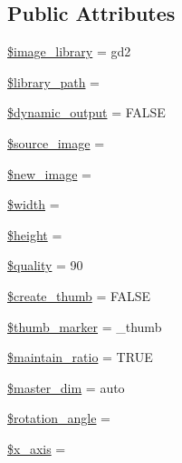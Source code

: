 \subsection*{Public Attributes}
\begin{DoxyCompactItemize}
\item 
\mbox{\hyperlink{class_c_i___image__lib_ac4b224358e1169eec8db344bcb3186c0}{\$image\+\_\+library}} = \textquotesingle{}gd2\textquotesingle{}
\item 
\mbox{\hyperlink{class_c_i___image__lib_ac09f7fc802884aae2149f1df0e53f17a}{\$library\+\_\+path}} = \textquotesingle{}\textquotesingle{}
\item 
\mbox{\hyperlink{class_c_i___image__lib_ad90737913d82776e7d3a7dfaef68e167}{\$dynamic\+\_\+output}} = F\+A\+L\+SE
\item 
\mbox{\hyperlink{class_c_i___image__lib_a54fc395722d5e9f15d656d22ba84e382}{\$source\+\_\+image}} = \textquotesingle{}\textquotesingle{}
\item 
\mbox{\hyperlink{class_c_i___image__lib_a6147ac30032312f2b42a9b05618faf12}{\$new\+\_\+image}} = \textquotesingle{}\textquotesingle{}
\item 
\mbox{\hyperlink{class_c_i___image__lib_a5795120b4b324bc4ca83f1e6fdce7d57}{\$width}} = \textquotesingle{}\textquotesingle{}
\item 
\mbox{\hyperlink{class_c_i___image__lib_a2c265bba1724371bb03e6901297c30b2}{\$height}} = \textquotesingle{}\textquotesingle{}
\item 
\mbox{\hyperlink{class_c_i___image__lib_a0e342ea32cccdc2c932ad23b9796a62a}{\$quality}} = 90
\item 
\mbox{\hyperlink{class_c_i___image__lib_ab1250903cbadaaadb42ec188d38ab398}{\$create\+\_\+thumb}} = F\+A\+L\+SE
\item 
\mbox{\hyperlink{class_c_i___image__lib_a3176700c651c0c3cd8cfa186ba03302a}{\$thumb\+\_\+marker}} = \textquotesingle{}\+\_\+thumb\textquotesingle{}
\item 
\mbox{\hyperlink{class_c_i___image__lib_a7fe1beb3e7d60245c97c60ee4b668d93}{\$maintain\+\_\+ratio}} = T\+R\+UE
\item 
\mbox{\hyperlink{class_c_i___image__lib_ae86c3d7ce316cc0c48a8dcba8ae4130d}{\$master\+\_\+dim}} = \textquotesingle{}auto\textquotesingle{}
\item 
\mbox{\hyperlink{class_c_i___image__lib_a9410d2e216c0c1dd852031f2a39e7ec7}{\$rotation\+\_\+angle}} = \textquotesingle{}\textquotesingle{}
\item 
\mbox{\hyperlink{class_c_i___image__lib_a128914b11765a500690f876962196ca6}{\$x\+\_\+axis}} = \textquotesingle{}\textquotesingle{}

\end{DoxyCompactItemize}
